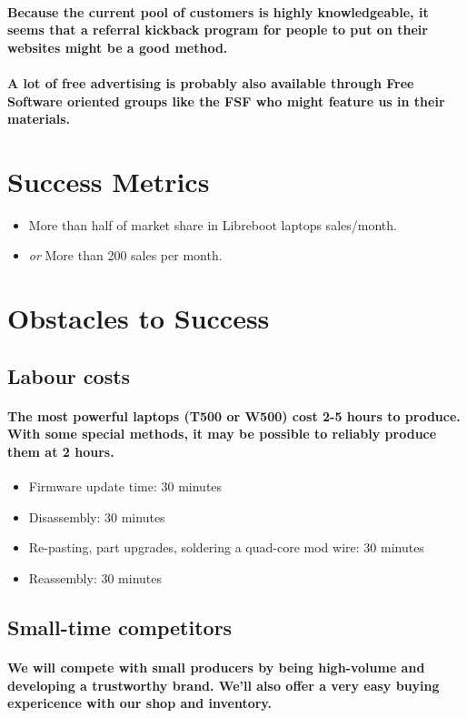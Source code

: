 \documentclass{article}
\begin{document}
\paragraph{Because the current pool of customers is highly knowledgeable, it seems
that a referral kickback program for people to put on their websites
might be a good method.}

\paragraph{A lot of free advertising is probably also available through Free Software
oriented groups like the FSF who might feature us in their materials.}

\section{Success Metrics}
\begin{itemize}
    \item \small More than half of market share in Libreboot laptops sales/month. \normalsize
    \item \textit{or} More than 200 sales per month. \normalsize
\end{itemize}

\section{Obstacles to Success}
\subsection{Labour costs}
\paragraph{The most powerful laptops (T500 or W500) cost 2-5 hours to produce. With
some special methods, it may be possible to reliably produce them at 2 hours.}
\begin{itemize}
    \item \small Firmware update time: 30 minutes \normalsize
    \item \small Disassembly: 30 minutes \normalsize
    \item \small Re-pasting, part upgrades, soldering a quad-core mod wire: 30 minutes \normalsize
    \item \small Reassembly: 30 minutes \normalsize
\end{itemize}
\smallskip

\subsection{Small-time competitors}
\paragraph{We will compete with small producers by being high-volume and developing
a trustworthy brand. We'll also offer a very easy buying expericence
with our shop and inventory.}
\end{document}
